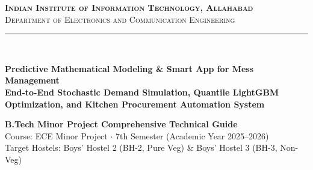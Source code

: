 \documentclass[11pt,a4paper,oneside]{report}
\begin{document}
\begin{titlepage}

\centering
\vspace*{0.5cm}

{\scshape\Large\textbf{Indian Institute of Information Technology, Allahabad}}\\[0.3cm]
{\scshape\large Department of Electronics and Communication Engineering}\\[0.2cm]
{\color{gray}\rule{0.8\textwidth}{0.5pt}}\\[0.8cm]

\vspace{0.5cm}

{\Huge\bfseries\color{iiitablue} Predictive Mathematical Modeling \& Smart App for Mess Management}\\[0.4cm]
{\Large\bfseries\color{iiitaaccent} End-to-End Stochastic Demand Simulation, Quantile LightGBM Optimization, and Kitchen Procurement Automation System}\\[0.6cm]

\vfill

\begin{tcolorbox}[colback=lightgraybg,colframe=iiitablue,arc=2mm,boxrule=1pt,width=0.92\textwidth]
\centering
\textbf{\large B.Tech Minor Project Comprehensive Technical Guide}\\[0.15cm]
\textsf{Course:} ECE Minor Project $\cdot$ 7th Semester (Academic Year 2025--2026)\\[0.1cm]
\textsf{Target Hostels:} Boys' Hostel 2 (BH-2, Pure Veg) \& Boys' Hostel 3 (BH-3, Non-Veg)
\end{tcolorbox}

\vfill


\end{titlepage}
\end{document}
